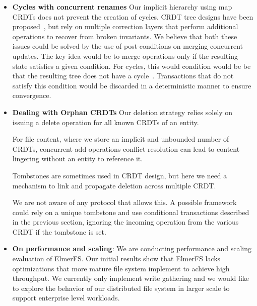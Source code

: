 \documentclass[sigconf, 10pt]{acmart}
\begin{document}
\begin{itemize}

    \item \textbf{Cycles with concurrent renames}
    Our implicit hierarchy using map CRDTs does not prevent the creation of cycles.
    CRDT tree designs have been proposed~\cite{martin2012abstract}\cite{ahmed2012file}, but rely on multiple correction
    layers that perform additional operations to recover from broken invariants.
    We believe that both these issues could be solved by the use of post-conditions on merging concurrent updates.
    The key idea would be to merge operations only if the resulting state satisfies a given condition.
    For cycles, this would condition would be be that the resulting tree does not have a cycle~\cite{nair:hal-03150817}.
    Transactions that do not satisfy this condition would be discarded in a deterministic manner to ensure convergence.

    \item \textbf{Dealing with Orphan CRDTs}
    Our deletion strategy relies solely on issuing a delete operation for all
    known CRDTs of an entity.

    For file content, where we store an implicit and unbounded number of CRDTs,
    concurrent add operations conflict resolution can lead to content lingering
    without an entity to reference it.

    Tombstones are sometimes used in CRDT design, but here we need a mechanism to link and propagate deletion across multiple CRDT.

    We are not aware of any protocol that allows this. A possible framework could rely on a unique tombstone and use conditional
    transactions described in the previous section, ignoring the incoming operation from the various CRDT if the tombstone is set.

    \item \textbf{On performance and scaling}: We are conducting performance and scaling evaluation of ElmerFS.
    Our initial results show that ElmerFS lacks optimizations that more mature file system implement to achieve high throughput.
    We currently only implement write gathering and we would like to explore the behavior of our distributed file system in larger scale to support enterprise level workloads.


\end{itemize}
\end{document}
